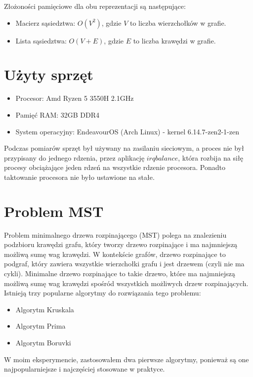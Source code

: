 \documentclass{article}
\begin{document}
Złożoności pamięciowe dla obu reprezentacji są następujące:
\begin{itemize}
    \item Macierz sąsiedztwa: $O(V^2)$, gdzie $V$ to liczba wierzchołków w grafie.
    \item Lista sąsiedztwa: $O(V + E)$, gdzie $E$ to liczba krawędzi w grafie.
\end{itemize}

\section{Użyty sprzęt}

\begin{itemize}
    \item Procesor: Amd Ryzen 5 3550H 2.1GHz
    \item Pamięć RAM: 32GB DDR4
    \item System operacyjny: EndeavourOS (Arch Linux) - kernel 6.14.7-zen2-1-zen
\end{itemize}

Podczas pomiarów sprzęt był używany na zasilaniu sieciowym, a proces nie był przypisany do jednego rdzenia, przez aplikację $irqbalance$, która rozbija na siłę procesy
obciążające jeden rdzeń na wszystkie rdzenie procesora. Ponadto taktowanie procesora nie było ustawione na stałe.

\section{Problem MST}

Problem minimalnego drzewa rozpinającego (MST) polega na znalezieniu podzbioru krawędzi grafu, który tworzy drzewo rozpinające i ma najmniejszą możliwą sumę wag krawędzi.
W kontekście grafów, drzewo rozpinające to podgraf, który zawiera wszystkie wierzchołki grafu i jest drzewem (czyli nie ma cykli). Minimalne drzewo rozpinające to takie drzewo, które ma najmniejszą możliwą sumę wag krawędzi spośród wszystkich możliwych drzew rozpinających.
Istnieją trzy popularne algorytmy do rozwiązania tego problemu:
\begin{itemize}
    \item Algorytm Kruskala
    \item Algorytm Prima
    \item Algorytm Boruvki
\end{itemize}

W moim eksperymencie, zastosowałem dwa pierwsze algorytmy, ponieważ są one najpopularniejsze i najczęściej stosowane w praktyce.
\end{document}
